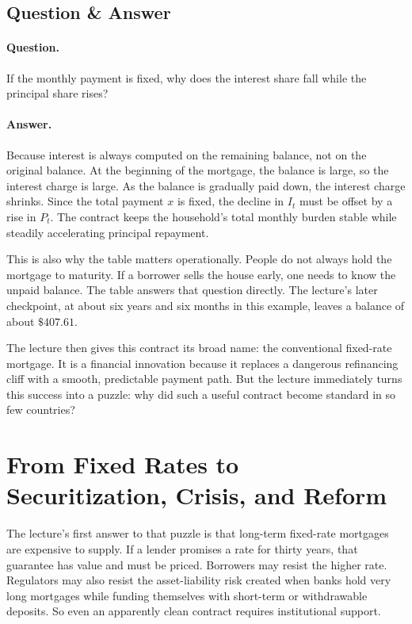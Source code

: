 \subsection{Question \& Answer}

\paragraph{Question.} If the monthly payment is fixed, why does the interest share fall while the principal share rises?

\paragraph{Answer.} Because interest is always computed on the remaining balance, not on the original balance. At the beginning of the mortgage, the balance is large, so the interest charge is large. As the balance is gradually paid down, the interest charge shrinks. Since the total payment \(x\) is fixed, the decline in \(I_t\) must be offset by a rise in \(P_t\). The contract keeps the household's total monthly burden stable while steadily accelerating principal repayment.

This is also why the table matters operationally. People do not always hold the mortgage to maturity. If a borrower sells the house early, one needs to know the unpaid balance. The table answers that question directly. The lecture's later checkpoint, at about six years and six months in this example, leaves a balance of about \(\$407.61\).

The lecture then gives this contract its broad name: the conventional fixed-rate mortgage. It is a financial innovation because it replaces a dangerous refinancing cliff with a smooth, predictable payment path. But the lecture immediately turns this success into a puzzle: why did such a useful contract become standard in so few countries?

\section{From Fixed Rates to Securitization, Crisis, and Reform}

The lecture's first answer to that puzzle is that long-term fixed-rate mortgages are expensive to supply. If a lender promises a rate for thirty years, that guarantee has value and must be priced. Borrowers may resist the higher rate. Regulators may also resist the asset-liability risk created when banks hold very long mortgages while funding themselves with short-term or withdrawable deposits. So even an apparently clean contract requires institutional support.

